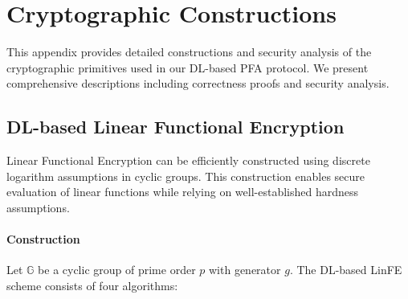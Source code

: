 \section{Cryptographic Constructions}\label{Appendix:Crypto}

This appendix provides detailed constructions and security analysis of the cryptographic primitives used in our DL-based PFA protocol. We present comprehensive descriptions including correctness proofs and security analysis.

\subsection{DL-based Linear Functional Encryption}\label{Appendix:DL-based LinFE}

Linear Functional Encryption can be efficiently constructed using discrete logarithm assumptions in cyclic groups. This construction enables secure evaluation of linear functions while relying on well-established hardness assumptions.

\paragraph{Construction}
Let $\mathbb{G}$ be a cyclic group of prime order $p$ with generator $g$. The DL-based LinFE scheme consists of four algorithms:

